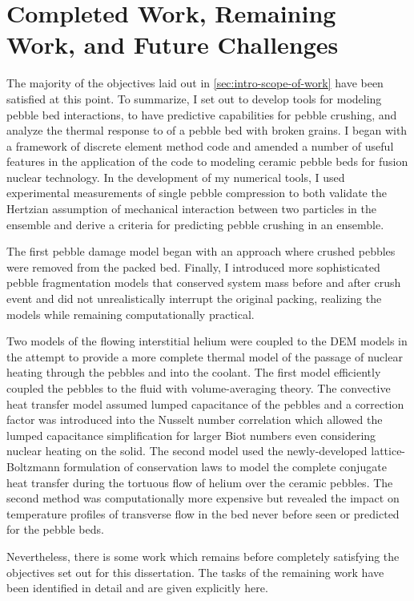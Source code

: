 \chapter{Completed Work, Remaining Work, and Future Challenges}\label{sec:remaining}

The majority of the objectives laid out in \cref{sec:intro-scope-of-work} have been satisfied at this point. To summarize, I set out to develop tools for modeling pebble bed interactions, to have predictive capabilities for pebble crushing, and analyze the thermal response to of a pebble bed with broken grains. I began with a framework of discrete element method code and amended a number of useful features in the application of the code to modeling ceramic pebble beds for fusion nuclear technology. In the development of my numerical tools, I used experimental measurements of single pebble compression to both validate the Hertzian assumption of mechanical interaction between two particles in the ensemble and derive a criteria for predicting pebble crushing in an ensemble.

The first pebble damage model began with an approach where crushed pebbles were removed from the packed bed. Finally, I introduced more sophisticated pebble fragmentation models that conserved system mass before and after crush event and did not unrealistically interrupt the original packing, realizing the models while remaining computationally practical. 

Two models of the flowing interstitial helium were coupled to the DEM models in the attempt to provide a more complete thermal model of the passage of nuclear heating through the pebbles and into the coolant. The first model efficiently coupled the pebbles to the fluid with volume-averaging theory. The convective heat transfer model assumed lumped capacitance of the pebbles and a correction factor was introduced into the Nusselt number correlation which allowed the lumped capacitance simplification for larger Biot numbers even considering nuclear heating on the solid. The second model used the newly-developed lattice-Boltzmann formulation of conservation laws to model the complete conjugate heat transfer during the tortuous flow of helium over the ceramic pebbles. The second method was computationally more expensive but revealed the impact on temperature profiles of transverse flow in the bed never before seen or predicted for the pebble beds.

Nevertheless, there is some work which remains before completely satisfying the objectives set out for this dissertation. The tasks of the remaining work have been identified in detail and are given explicitly here.




